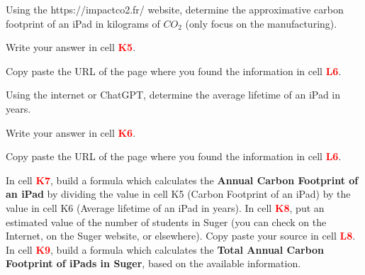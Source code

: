 \documentclass{exam}
\begin{document}
\begin{questions} 
  \question Using the https://impactco2.fr/ website, determine the approximative carbon footprint of an iPad in kilograms of $CO_2$ (only focus on the manufacturing).
  \begin{compactitem}
    \item Write your answer in cell \textbf{\textcolor{red}{K5}}.
    \item Copy paste the URL of the page where you found the information in cell \textbf{\textcolor{red}{L6}}.
  \end{compactitem}
  \question Using the internet or ChatGPT, determine the average lifetime of an iPad in years.
    \begin{compactitem}
    \item Write your answer in cell \textbf{\textcolor{red}{K6}}.
    \item Copy paste the URL of the page where you found the information in cell \textbf{\textcolor{red}{L6}}.
  \end{compactitem}
  \question In cell \textbf{\textcolor{red}{K7}}, build a formula which calculates the \textbf{Annual Carbon Footprint of an iPad} by dividing the value in cell K5 (Carbon Footprint of an iPad) by the value in cell K6 (Average lifetime of an iPad in years).
  \question In cell \textbf{\textcolor{red}{K8}}, put an estimated value of the number of students in Suger (you can check on the Internet, on the Suger website, or elsewhere). Copy paste your source in cell \textbf{\textcolor{red}{L8}}.
  \question In cell \textbf{\textcolor{red}{K9}}, build a formula which calculates the \textbf{Total Annual Carbon Footprint of iPads in Suger}, based on the available information.
\end{questions}
\end{document}
